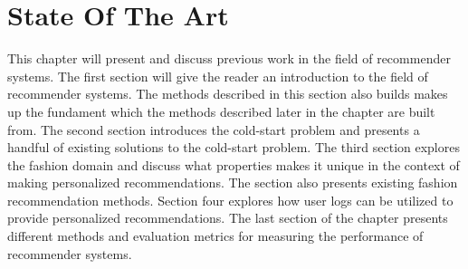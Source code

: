 
\chapter{State Of The Art}
\minitoc
\label{chap:SotA}

This chapter will present and discuss previous work in the field of recommender
systems. The first section will give the reader an introduction to the field of
recommender systems. The methods described in this section also builds makes up the
fundament which the methods described later in the chapter are built from.
The second section introduces the cold-start problem and presents a handful of existing
solutions to the cold-start problem. The third section explores the fashion domain
and discuss what properties makes it unique in the context of making personalized
recommendations. The section also presents existing fashion recommendation methods. 
Section four explores how user logs can be utilized to provide personalized recommendations.
The last section of the chapter presents different methods and evaluation metrics for measuring
the performance of recommender systems.


\restoregeometry

\clearpage






